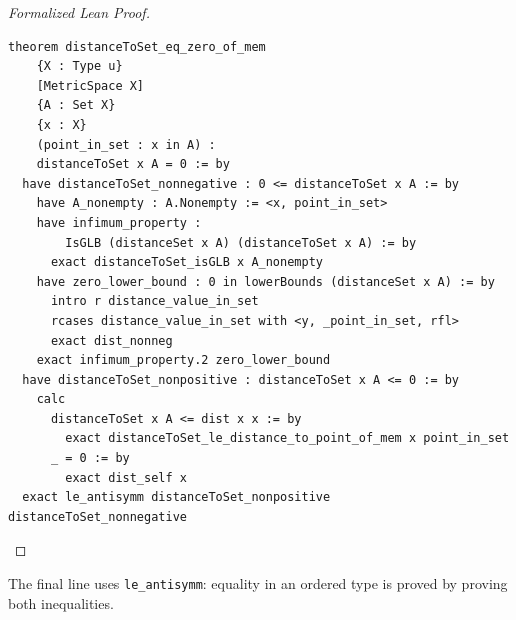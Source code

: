 \begin{proof}[Formalized Lean Proof]
\begin{verbatim}
theorem distanceToSet_eq_zero_of_mem
    {X : Type u}
    [MetricSpace X]
    {A : Set X}
    {x : X}
    (point_in_set : x in A) :
    distanceToSet x A = 0 := by
  have distanceToSet_nonnegative : 0 <= distanceToSet x A := by
    have A_nonempty : A.Nonempty := <x, point_in_set>
    have infimum_property :
        IsGLB (distanceSet x A) (distanceToSet x A) := by
      exact distanceToSet_isGLB x A_nonempty
    have zero_lower_bound : 0 in lowerBounds (distanceSet x A) := by
      intro r distance_value_in_set
      rcases distance_value_in_set with <y, _point_in_set, rfl>
      exact dist_nonneg
    exact infimum_property.2 zero_lower_bound
  have distanceToSet_nonpositive : distanceToSet x A <= 0 := by
    calc
      distanceToSet x A <= dist x x := by
        exact distanceToSet_le_distance_to_point_of_mem x point_in_set
      _ = 0 := by
        exact dist_self x
  exact le_antisymm distanceToSet_nonpositive distanceToSet_nonnegative
\end{verbatim}
\end{proof}

\begin{remark*}
The final line uses \texttt{le\_antisymm}: equality in an ordered type is
proved by proving both inequalities.
\end{remark*}

\NoLocalDependencies

\clearpage
